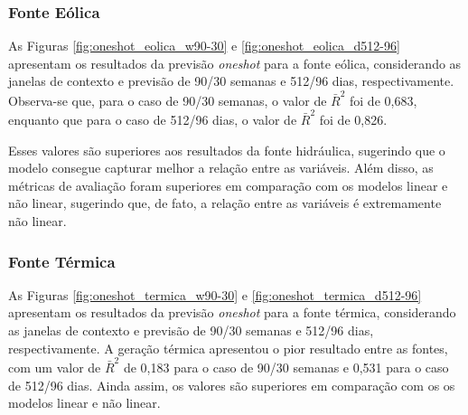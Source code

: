 \subsubsection{Fonte Eólica}
\begin{figure}[!ht]
  {}
  {}
\end{figure}
\begin{figure}[!ht]
  {}
  {}
\end{figure}
As Figuras \ref{fig:oneshot_eolica_w90-30} e \ref{fig:oneshot_eolica_d512-96} apresentam os resultados da previsão
\textit{oneshot} para a fonte eólica, considerando as janelas de contexto e previsão de 90/30 semanas e 512/96 dias, respectivamente.
Observa-se que, para o caso de 90/30 semanas, o valor de $\bar{R}^2$ foi de 0,683, enquanto que para o caso de 512/96 dias, o valor 
de $\bar{R}^2$ foi de 0,826.

Esses valores são superiores aos resultados da fonte hidráulica, sugerindo que o modelo consegue capturar melhor a relação
entre as variáveis. Além disso, as métricas de avaliação foram superiores em comparação com os modelos
linear e não linear, sugerindo que, de fato, a relação entre as variáveis é extremamente não linear.

\subsubsection{Fonte Térmica}
\begin{figure}[!ht]
  {}
  {}
\end{figure}
\begin{figure}[!ht]
  {}
  {}
\end{figure}
As Figuras \ref{fig:oneshot_termica_w90-30} e \ref{fig:oneshot_termica_d512-96} apresentam os resultados da previsão
\textit{oneshot} para a fonte térmica, considerando as janelas de contexto e previsão de 90/30 semanas e 512/96 dias, respectivamente.
A geração térmica apresentou o pior resultado entre as fontes, com um valor de $\bar{R}^2$ de 0,183 para o caso de 90/30 semanas
e 0,531 para o caso de 512/96 dias. Ainda assim, os valores são superiores em comparação com os os
modelos linear e não linear.

